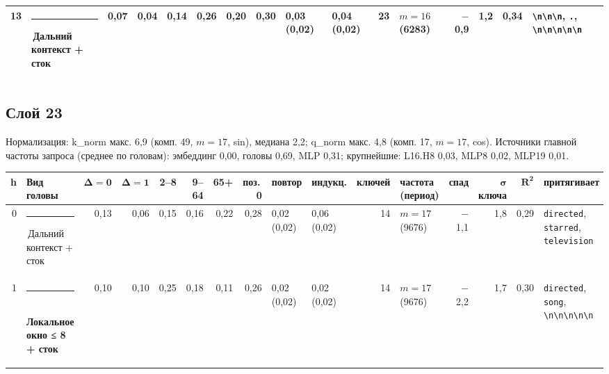 \documentclass[10pt]{article}
\begin{document}
\begin{minipage}{\linewidth}
\begin{center}
{\begin{tabular}{|r|l|r|r|r|r|r|r|l|l|r|l|r|r|r|l|}
13 & \textcolor[HTML]{C3C2B7}{\rule{0.62em}{0.62em}}\,Дальний контекст + сток & 0,07 & 0,04 & 0,14 & 0,26 & 0,20 & 0,30 & 0,03 (0,02) & 0,04 (0,02) & 23 & $m{=}16$ (6283) & $-$0,9 & 1,2 & 0,34 & \texttt{\textvisiblespace{}\textbackslash{}n\textbackslash{}n\textbackslash{}n}, \texttt{\textvisiblespace{}.}, \texttt{\textbackslash{}n\textbackslash{}n\textbackslash{}n\textbackslash{}n\textbackslash{}n} \\ \hline
\hline\end{tabular}}\end{center}
\end{minipage}
\par\vspace{0.4em}
\noindent\begin{minipage}{\linewidth}
\subsection*{Слой 23}
{\small\color{ink2} Нормализация: k\_norm макс. 6,9 (комп. 49, $m{=}17$, sin), медиана 2,2; q\_norm макс. 4,8 (комп. 17, $m{=}17$, cos). Источники главной частоты запроса (среднее по головам): эмбеддинг 0,00, головы 0,69, MLP 0,31; крупнейшие: L16.H8 0,03, MLP8 0,02, MLP19 0,01.}
\begin{center}{\footnotesize\begin{tabular}{|r|l|r|r|r|r|r|r|l|l|r|l|r|r|r|l|}
\hline
\rowcolor{head}\textbf{h} & \textbf{Вид головы} & $\boldsymbol{\Delta{=}0}$ & $\boldsymbol{\Delta{=}1}$ & \textbf{2–8} & \textbf{9–64} & \textbf{65+} & \textbf{поз.\,0} & \textbf{повтор} & \textbf{индукц.} & \textbf{ключей} & \textbf{частота (период)} & \textbf{спад} & $\boldsymbol{\sigma}$ \textbf{ключа} & $\boldsymbol{R^2}$ & \textbf{притягивает} \\ \hline
0 & \textcolor[HTML]{C3C2B7}{\rule{0.62em}{0.62em}}\,Дальний контекст + сток & 0,13 & 0,06 & 0,15 & 0,16 & 0,22 & 0,28 & 0,02 (0,02) & 0,06 (0,02) & 14 & $m{=}17$ (9676) & $-$1,1 & 1,8 & 0,29 & \texttt{\textvisiblespace{}directed}, \texttt{\textvisiblespace{}starred}, \texttt{\textvisiblespace{}television} \\ \hline
1 & \textcolor[HTML]{1BAF7A}{\rule{0.62em}{0.62em}}\,\textbf{Локальное окно ≤ 8 + сток} & 0,10 & 0,10 & 0,25 & 0,18 & 0,11 & 0,26 & 0,02 (0,02) & 0,02 (0,02) & 14 & $m{=}17$ (9676) & $-$2,2 & 1,7 & 0,30 & \texttt{\textvisiblespace{}directed}, \texttt{\textvisiblespace{}song}, \texttt{\textbackslash{}n\textbackslash{}n\textbackslash{}n\textbackslash{}n\textbackslash{}n} \\ \hline

\end{tabular}}
\end{center}
\end{minipage}
\end{document}
